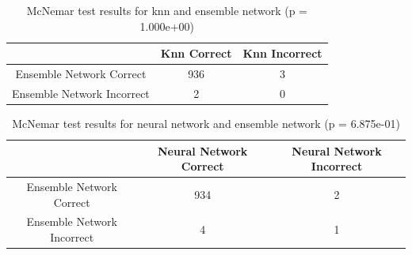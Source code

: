 \documentclass[paper=a4, fontsize=11pt]{scrartcl} %
\begin{document}
\begin{appendices}
\begin{table}[H]
	\centering
	\caption{McNemar test results for knn and ensemble network (p = 1.000e+00)}
	\begin{tabular}{|c||c|c|}
		\hline
		& Knn Correct & Knn Incorrect \\ \hline \hline
		Ensemble Network Correct & 936 & 3 \\ \hline
		Ensemble Network Incorrect& 2 & 0 \\ \hline
	\end{tabular}
\end{table}

\begin{table}[H]
	\centering
	\caption{McNemar test results for neural network and ensemble network (p = 6.875e-01)}
	\begin{tabular}{|c||c|c|}
		\hline
		& Neural Network Correct & Neural Network Incorrect \\ \hline \hline
		Ensemble Network Correct & 934 & 2 \\ \hline
		Ensemble Network Incorrect& 4 & 1 \\ \hline
	\end{tabular}
\end{table}
\end{appendices}


\end{document}
